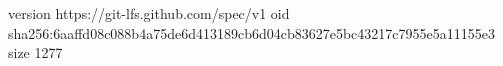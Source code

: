 version https://git-lfs.github.com/spec/v1
oid sha256:6aaffd08c088b4a75de6d413189cb6d04cb83627e5bc43217c7955e5a11155e3
size 1277
